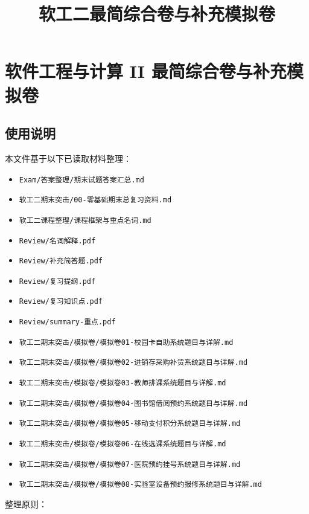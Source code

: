 \documentclass[UTF8,zihao=-4]{ctexart}
\title{软工二最简综合卷与补充模拟卷}
\author{}
\date{}
\begin{document}
\maketitle
\setcounter{tocdepth}{1}
\tableofcontents
\newpage

\section{软件工程与计算 II 最简综合卷与补充模拟卷}


\subsection{使用说明}


本文件基于以下已读取材料整理：


\begin{itemize}
\item \texttt{Exam/答案整理/期末试题答案汇总.md}
\item \texttt{软工二期末突击/00-零基础期末总复习资料.md}
\item \texttt{软工二课程整理/课程框架与重点名词.md}
\item \texttt{Review/名词解释.pdf}
\item \texttt{Review/补充简答题.pdf}
\item \texttt{Review/复习提纲.pdf}
\item \texttt{Review/复习知识点.pdf}
\item \texttt{Review/summary-重点.pdf}
\item \texttt{软工二期末突击/模拟卷/模拟卷01-校园卡自助系统题目与详解.md}
\item \texttt{软工二期末突击/模拟卷/模拟卷02-进销存采购补货系统题目与详解.md}
\item \texttt{软工二期末突击/模拟卷/模拟卷03-教师排课系统题目与详解.md}
\item \texttt{软工二期末突击/模拟卷/模拟卷04-图书馆借阅预约系统题目与详解.md}
\item \texttt{软工二期末突击/模拟卷/模拟卷05-移动支付积分系统题目与详解.md}
\item \texttt{软工二期末突击/模拟卷/模拟卷06-在线选课系统题目与详解.md}
\item \texttt{软工二期末突击/模拟卷/模拟卷07-医院预约挂号系统题目与详解.md}
\item \texttt{软工二期末突击/模拟卷/模拟卷08-实验室设备预约报修系统题目与详解.md}
\end{itemize}


整理原则：
\end{document}
